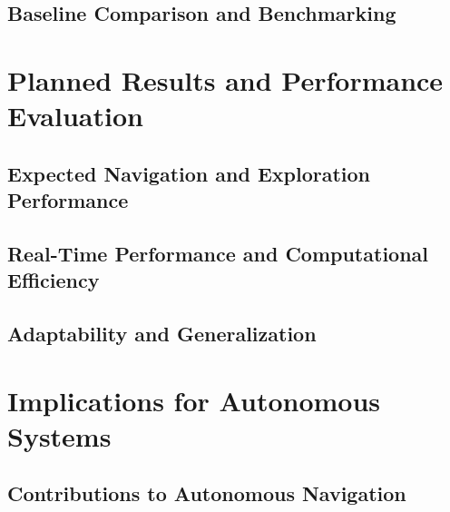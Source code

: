 \subsection{Baseline Comparison and Benchmarking}

\section{Planned Results and Performance Evaluation}

\subsection{Expected Navigation and Exploration Performance}

\subsection{Real-Time Performance and Computational Efficiency}

\subsection{Adaptability and Generalization}

\section{Implications for Autonomous Systems}

\subsection{Contributions to Autonomous Navigation}

